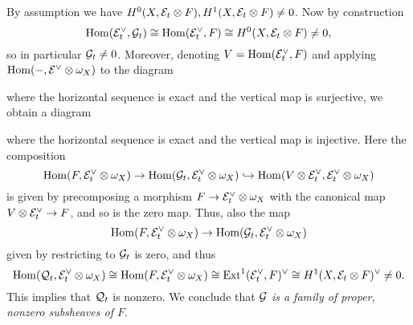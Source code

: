 \documentclass[letterpaper,12pt]{article}
\theoremstyle{remark}
\begin{document}
By assumption we have $H^0(X, \mathcal{E}_t \otimes F), H^1(X, \mathcal{E}_t \otimes F) \neq 0$. Now by construction
\[ \mathrm{Hom}(\mathcal{E}_t^\vee, \mathcal{G}_t) \cong \mathrm{Hom}(\mathcal{E}_t^\vee, F) \cong H^0(X, \mathcal{E}_t \otimes F) \neq 0, \]
so in particular $\mathcal{G}_t \neq 0$. Moreover, denoting $V = \mathrm{Hom}(\mathcal{E}_t^\vee, F)$ and applying $\mathrm{Hom}(-, \mathcal{E}^\vee \otimes \omega_X)$ to the diagram
\begin{center}
\end{center}
where the horizontal sequence is exact and the vertical map is surjective, we obtain a diagram
\begin{center}
\end{center}
where the horizontal sequence is exact and the vertical map is injective. Here the composition
\[ \mathrm{Hom}(F, \mathcal{E}_t^\vee \otimes \omega_X) \to \mathrm{Hom}(\mathcal{G}_t, \mathcal{E}_t^\vee \otimes \omega_X) \hookrightarrow \mathrm{Hom}(V \otimes \mathcal{E}_t^\vee, \mathcal{E}_t^\vee \otimes \omega_X) \]
is given by precomposing a morphism $F \to \mathcal{E}_t^\vee \otimes \omega_X$ with the canonical map $V \otimes \mathcal{E}_t^\vee \to F$, and so is the zero map. Thus, also the map
\[ \mathrm{Hom}(F, \mathcal{E}_t^\vee \otimes \omega_X) \to \mathrm{Hom}(\mathcal{G}_t, \mathcal{E}_t^\vee \otimes \omega_X) \]
given by restricting to $\mathcal{G}_t$ is zero, and thus 
\[ \mathrm{Hom}(\mathcal{Q}_t, \mathcal{E}_t^\vee \otimes \omega_X) \cong \mathrm{Hom}(F, \mathcal{E}_t^\vee \otimes \omega_X) \cong \mathrm{Ext}^1(\mathcal{E}_t^\vee, F)^\vee \cong H^1(X, \mathcal{E}_t \otimes F)^\vee \neq 0. \]
This implies that $\mathcal{Q}_t$ is nonzero. We conclude that \emph{$\mathcal{G}$ is a family of proper, nonzero subsheaves of $F$}.
\end{document}
